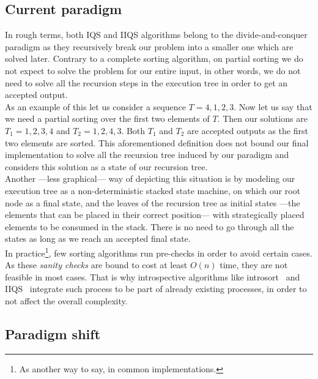 \subsection{Current paradigm}
In rough terms, both IQS and IIQS algorithms belong to the divide-and-conquer paradigm as they recursively break our problem into a smaller one which are solved later. Contrary to a complete sorting algorithm, on partial sorting we do not expect to solve the problem for our entire input, in other words, we do not need to solve all the recursion steps in the execution tree in order to get an accepted output. \\

As an example of this let us consider a sequence $T={4,1,2,3}$. Now let us say that we need a partial sorting over the first two elements of $T$. Then our solutions are $T_1={1,2,3,4}$ and $T_2={1,2,4,3}$. Both $T_1$ and $T_2$ are accepted outputs as the first two elements are sorted. This aforementioned definition does not bound our final implementation to solve all the recursion tree induced by our paradigm and considers this solution as a state of our recursion tree. \\

Another ---less graphical--- way of depicting this situation is by modeling our execution tree as a non-deterministic stacked state machine, on which our root node as a final state, and the leaves of the recursion tree as initial states ---the elements that can be placed in their correct position--- with strategically placed elements to be consumed in the stack. There is no need to go through all the states as long as we reach an accepted final state.\\


In practice\footnote{As another way to say, in common implementations.}, few sorting algorithms run pre-checks in order to avoid certain cases. As these \emph{sanity checks} are bound to cost at least $O(n)$ time, they are not feasible in most cases. That is why introspective algorithms like introsort~\cite{MusserIntroSort} and IIQS~\cite{7416566} integrate such process to be part of already existing processes, in order to not affect the overall complexity. \\

\subsection{Paradigm shift}

